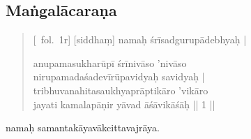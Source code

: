 \documentclass[12pt]{article}
\newcommand{\emdash} {\hspace{0em}—\hspace{0em}}
\begin{document}
\subsection{Maṅgalācaraṇa}
\begin{quote}
	[\MS\ fol.\ 1r] [siddhaṃ]\footnoteB{
		[siddhaṃ]] \MS ; oṁ \EDD
	} namaḥ śrīsadgurupādebhyaḥ |
	

	anupamasukharūpī śrīnivāso 'nivāso \\
	nirupamadaśadevīrūpavidyaḥ\footnoteB{
		nirupama°] \EDD\ ; nirūpama° \MS
	} savidyaḥ |\\
	tribhuvanahitasaukhyaprāptikāro 'vikāro \\
	jayati kamalapāṇir yāvad āśāvikāśāḥ\footnoteB{
		āśāvikāśāḥ] \corr ; āśāvikāsāḥ \MS\ \EDD
	} || 1 ||
	
% 	
\end{quote}

\medskip\noindent [\MS\ fol.\ 2r3] namaḥ samantakāyavākcittavajrāya.\\

% 
\end{document}
